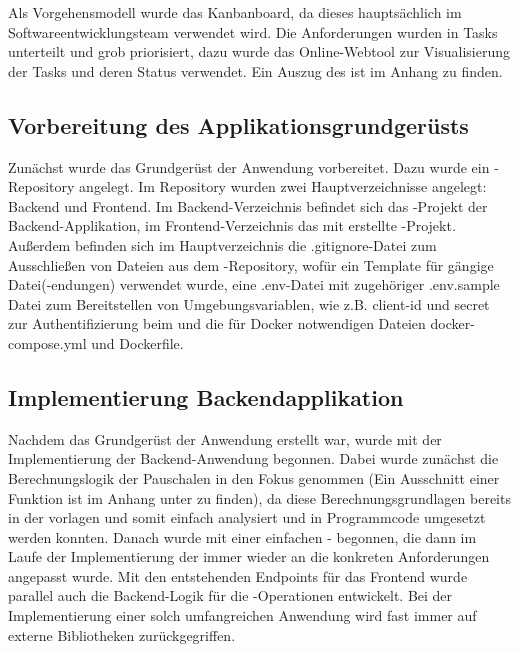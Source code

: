 Als Vorgehensmodell wurde das Kanbanboard, da dieses hauptsächlich im Softwareentwicklungsteam verwendet wird. Die Anforderungen wurden in Tasks unterteilt und grob priorisiert, dazu wurde das Online-Webtool  zur Visualisierung der Tasks und deren Status verwendet.
Ein Auszug des  ist im Anhang zu finden.

\subsection{Vorbereitung des Applikationsgrundgerüsts}

Zunächst wurde das Grundgerüst der Anwendung vorbereitet. Dazu wurde ein -Repository angelegt. Im Repository wurden zwei Hauptverzeichnisse angelegt: Backend und Frontend. Im Backend-Verzeichnis befindet sich das -Projekt der Backend-Applikation, im Frontend-Verzeichnis das mit  erstellte  -Projekt. Außerdem befinden sich im Hauptverzeichnis die .gitignore-Datei zum Ausschließen von Dateien aus dem -Repository, wofür ein Template für gängige Datei(-endungen) verwendet wurde, eine .env-Datei mit zugehöriger .env.sample Datei zum Bereitstellen von Umgebungsvariablen, wie z.B. client-id und secret zur Authentifizierung beim  und die für Docker notwendigen Dateien docker-compose.yml und Dockerfile.

\subsection{Implementierung Backendapplikation}

Nachdem das Grundgerüst der Anwendung erstellt war, wurde mit der Implementierung der Backend-Anwendung begonnen. Dabei wurde zunächst die Berechnungslogik der Pauschalen in den Fokus genommen (Ein Ausschnitt einer Funktion ist im Anhang unter  zu finden), da diese Berechnungsgrundlagen bereits in der  vorlagen und somit einfach analysiert und in Programmcode umgesetzt werden konnten. Danach wurde mit einer einfachen - begonnen, die dann im Laufe der Implementierung der  immer wieder an die konkreten Anforderungen angepasst wurde. Mit den entstehenden Endpoints für das Frontend wurde parallel auch die Backend-Logik für die -Operationen entwickelt. Bei der Implementierung einer solch umfangreichen Anwendung wird fast immer auf externe Bibliotheken zurückgegriffen.

